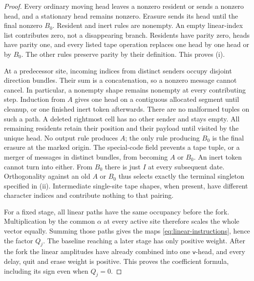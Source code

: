 \begin{proof}
Every ordinary moving head leaves a nonzero resident or sends a nonzero head, and a stationary head remains nonzero. Erasure sends its head until the final nonzero \(B_0\). Resident and inert rules are nonempty. An empty linear-index list contributes zero, not a disappearing branch. Residents have parity zero, heads have parity one, and every listed tape operation replaces one head by one head or by \(B_0\). The other rules preserve parity by their definition. This proves (i).

At a predecessor site, incoming indices from distinct senders occupy disjoint direction bundles. Their sum is a concatenation, so a nonzero message cannot cancel. In particular, a nonempty shape remains nonempty at every contributing step. Induction from \(A\) gives one head on a contiguous allocated segment until cleanup, or one finished inert token afterwards. There are no malformed tuples on such a path. A deleted rightmost cell has no other sender and stays empty. All remaining residents retain their position and their payload until visited by the unique head. No output rule produces \(A\); the only rule producing \(B_0\) is the final erasure at the marked origin. The special-code field prevents a tape tuple, or a merger of messages in distinct bundles, from becoming \(A\) or \(B_0\). An inert token cannot turn into either. From \(B_0\) there is just \(I\) at every subsequent date. Orthogonality against an old \(A\) or \(B_0\) thus selects exactly the terminal singleton specified in (ii). Intermediate single-site tape shapes, when present, have different character indices and contribute nothing to that pairing.

For a fixed stage, all linear paths have the same occupancy before the fork. Multiplication by the common \(\alpha\) at every active site therefore scales the whole vector equally. Summing those paths gives the maps \eqref{eq:linear-instructions}, hence the factor \(Q_j\). The baseline reaching a later stage has only positive weight. After the fork the linear amplitudes have already combined into one \(\mathsf v\)-head, and every delay, quit and erase weight is positive. This proves the coefficient formula, including its sign even when \(Q_j=0\).


\end{proof}
